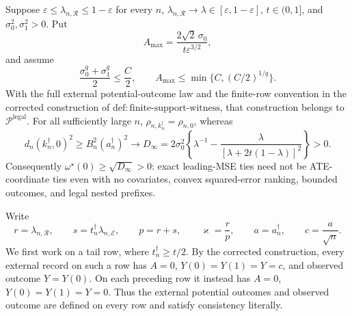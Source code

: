 Suppose \(\varepsilon\leq\lambda_{n,\mathcal R}\leq1-\varepsilon\) for every \(n\), \(\lambda_{n,\mathcal R}\to\lambda\in[\varepsilon,1-\varepsilon]\), \(t\in(0,1]\), and \(\sigma_0^2,\sigma_1^2>0\).  Put
\[
 A_{\max}=\frac{2\sqrt2\,\sigma_0}{t\varepsilon^{3/2}},
\]
and assume
\[
 \frac{\sigma_0^q+\sigma_1^q}{2}\leq\frac C2,
 \qquad A_{\max}\leq\min\{C,(C/2)^{1/q}\}.
\]
With the full external potential-outcome law and the finite-row convention in the corrected construction of \(\mathrm{def:finite\text{-}support\text{-}witness}\), that construction belongs to \(\mathcal P^{\mathrm{legal}}\).  For all sufficiently large \(n\), \(\rho_{n,k_n^{\dagger}}=\rho_{n,0}\), whereas
\[
 d_n(k_n^{\dagger},0)^2\geq B_n^2(a_n^{\dagger})^2
 \longrightarrow
 D_\infty=2\sigma_0^2\left\{\lambda^{-1}-
 \frac{\lambda}{[\lambda+2t(1-\lambda)]^2}\right\}>0.
\]
Consequently \(\omega^{\star}(0)\geq\sqrt{D_\infty}>0\): exact leading-MSE ties need not be ATE-coordinate ties even with no covariates, convex squared-error ranking, bounded outcomes, and legal nested prefixes.

Write
\[
 r=\lambda_{n,\mathcal R},\qquad
 s=t_n^{\dagger}\lambda_{n,\mathcal E},\qquad
 p=r+s,\qquad
 \varkappa=\frac rp,\qquad
 a=a_n^{\dagger},\qquad c=\frac a{\sqrt n}.
\tag{16}
\]
We first work on a tail row, where \(t_n^{\dagger}\geq t/2\).  By the corrected construction, every external record on such a row has \(A=0\), \(Y(0)=Y(1)=Y=c\), and observed outcome \(Y=Y(0)\).  On each preceding row it instead has \(A=0\), \(Y(0)=Y(1)=Y=0\).  Thus the external potential outcomes and observed outcome are defined on every row and satisfy consistency literally.

